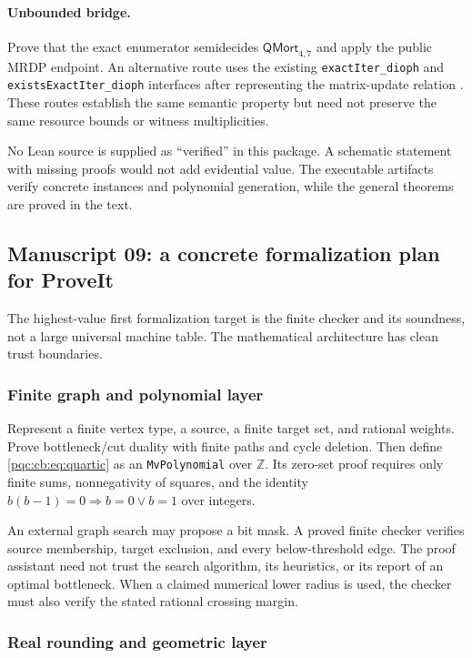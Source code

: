 \documentclass[11pt,letterpaper]{article}
\numberwithin{equation}{section}
\theoremstyle{definition}
\theoremstyle{remark}
\newcommand{\Z}{\mathbb Z}
\newcommand{\code}[1]{\nolinkurl{#1}}
\newcommand{\QMort}{\mathsf{QMort}}
\begin{document}
\paragraph{Unbounded bridge.}
Prove that the exact enumerator semidecides $\QMort_{4,7}$ and apply the public MRDP endpoint. An alternative route uses the existing \code{exactIter_dioph} and \code{existsExactIter_dioph} interfaces after representing the matrix-update relation \cite{proveit-trace}. These routes establish the same semantic property but need not preserve the same resource bounds or witness multiplicities.

No Lean source is supplied as ``verified'' in this package. A schematic statement with missing proofs would not add evidential value. The executable artifacts verify concrete instances and polynomial generation, while the general theorems are proved in the text.

\subsection{Manuscript 09: a concrete formalization plan for ProveIt}
\label{pqc:cb:sec:formalization}

The highest-value first formalization target is the finite checker and its
soundness, not a large universal machine table.  The mathematical architecture
has clean trust boundaries.

\subsubsection{Finite graph and polynomial layer}

Represent a finite vertex type, a source, a finite target set, and rational
weights.  Prove bottleneck/cut duality with finite paths and cycle deletion.
Then define \eqref{pqc:cb:eq:quartic} as an \code{MvPolynomial} over $\Z$.  Its zero-set
proof requires only finite sums, nonnegativity of squares, and the identity
$b(b-1)=0\Rightarrow b=0\lor b=1$ over integers.

An external graph search may propose a bit mask.  A proved finite checker
verifies source membership, target exclusion, and every below-threshold edge.
The proof assistant need not trust the search algorithm, its heuristics, or
its report of an optimal bottleneck.  When a claimed numerical lower radius is
used, the checker must also verify the stated rational crossing margin.

\subsubsection{Real rounding and geometric layer}
\end{document}
